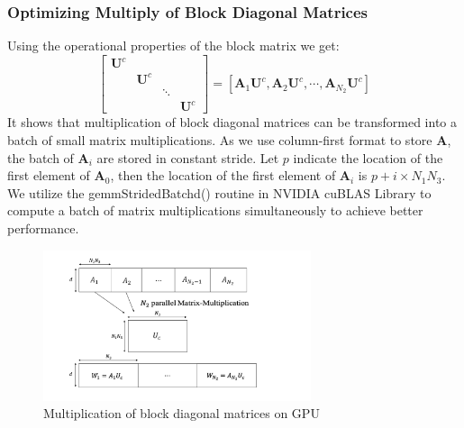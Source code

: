 \documentclass[futureinternet,article,submit,moreauthors,pdftex,10pt,a4paper]{Definitions/mdpi}
\theoremstyle{plain}
\theoremstyle{definition}
\theoremstyle{remark}
\begin{document}
\subsubsection{Optimizing Multiply of Block Diagonal Matrices}
Using the operational properties of the block matrix we get:
\begin{equation}
        [\mathbf{A}_1, \mathbf{A}_2, \cdots, \mathbf{A}_{N_2}]
        \begin{bmatrix}
            \mathbf{U}^c & & & \\
            & \mathbf{U}^c & & \\
            & & \ddots & \\
            & & & \mathbf{U}^c
        \end{bmatrix}
        =
        [\mathbf{A}_1\mathbf{U}^c, \mathbf{A}_2\mathbf{U}^c, \cdots, \mathbf{A}_{N_2}\mathbf{U}^c]
\label{step1}
\end{equation}
It shows that multiplication of block diagonal matrices can be transformed into a batch of small matrix multiplications. As we use column-first format to store $\mathbf{A}$, the batch of $\mathbf{A}_i$ are stored in constant stride. Let $p$ indicate the location of the first element of $\mathbf{A}_0$, then the location of the first element of $\mathbf{A}_i$ is $p+i\times N_1N_3$.  We utilize the gemmStridedBatchd() routine in NVIDIA cuBLAS Library to compute a batch of matrix multiplications simultaneously to achieve better performance.
\begin{figure}[H]
\centering
\includegraphics[width=0.7\textwidth]{diagMM.pdf}
\caption{Multiplication of block diagonal matrices on GPU}
\label{Fig:diagMM}
\end{figure}
\end{document}
